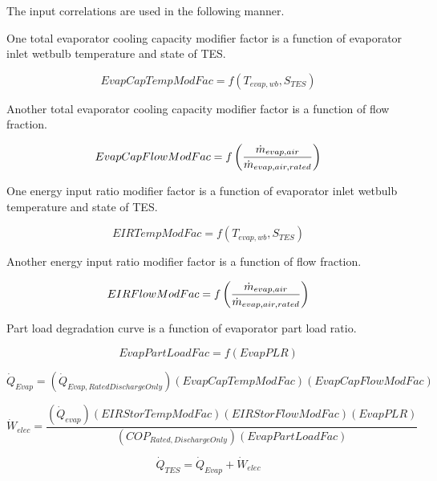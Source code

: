 The input correlations are used in the following manner.

One total evaporator cooling capacity modifier factor is a function of evaporator inlet wetbulb temperature and state of TES.

\begin{equation}
EvapCapTempModFac = f\left( {{T_{evap,wb}},{S_{TES}}} \right)
\end{equation}

Another total evaporator cooling capacity modifier factor is a function of flow fraction.

\begin{equation}
EvapCapFlowModFac = f\left(\frac{\dot{m}_{evap,air}}{\dot{m}_{evap,air,rated}}\right)
\end{equation}

One energy input ratio modifier factor is a function of evaporator inlet wetbulb temperature and state of TES.

\begin{equation}
EIRTempModFac = f\left( {{T_{evap,wb}},{S_{TES}}} \right)
\end{equation}

Another energy input ratio modifier factor is a function of flow fraction.

\begin{equation}
EIRFlowModFac = f\left(\frac{\dot{m}_{evap,air}}{\dot{m}_{evap,air,rated}}\right)
\end{equation}

Part load degradation curve is a function of evaporator part load ratio.

\begin{equation}
EvapPartLoadFac = f\left( {EvapPLR} \right)
\end{equation}

\begin{equation}
{\dot Q_{Evap}} = \left( {{{\dot Q}_{Evap,RatedDischargeOnly}}} \right)\left( {EvapCapTempModFac} \right)\left( {EvapCapFlowModFac} \right)
\end{equation}

\begin{equation}
{\dot W_{elec}} = \frac{{\left( {{{\dot Q}_{evap}}} \right)\left( {EIRStorTempModFac} \right)\left( {EIRStorFlowModFac} \right)\left( {EvapPLR} \right)}}{{\left( {CO{P_{Rated,DischargeOnly}}} \right)\left( {EvapPartLoadFac} \right)}}
\end{equation}

\begin{equation}
{\dot Q_{TES}} = {\dot Q_{Evap}} + {\dot W_{elec}}
\end{equation}

